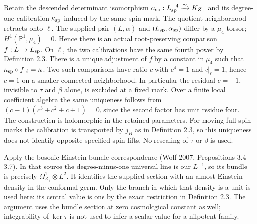 \documentclass[
  english,
  11pt,
  reqno]{amsart}
\begin{document}
Retain the descended determinant isomorphism
\(\alpha_{\rm sp}:L_{\rm sp}^{-4}\xrightarrow{\sim}K_{Z_+}\) and its
degree-one calibration \(\kappa_{\rm sp}\) induced by the same spin
mark. The quotient neighborhood retracts onto \(\ell\). The supplied
pair \((L,\alpha)\) and \((L_{\rm sp},\alpha_{\rm sp})\) differ by a
\(\mu_4\) torsor; \(H^1(\mathbb P^1,\mu_4)=0\). Hence there is an actual
root-preserving comparison \(f:L\to L_{\rm sp}\). On \(\ell\), the two
calibrations have the same fourth power by Definition 2.3. There is a
unique adjustment of \(f\) by a constant in \(\mu_4\) such that
\(\kappa_{\rm sp}\circ f|_\ell=\kappa\). Two such comparisons have ratio
\(c\) with \(c^4=1\) and \(c|_\ell=1\), hence \(c=1\) on a smaller
connected neighborhood. In particular the residual \(c=-1\), invisible
to \(\tau\) and \(\beta\) alone, is excluded at a fixed mark. Over a
finite local coefficient algebra the same uniqueness follows from
\((c-1)(c^3+c^2+c+1)=0\), since the second factor has unit residue four.
The construction is holomorphic in the retained parameters. For moving
full-spin marks the calibration is transported by \(j_B\) as in
Definition 2.3, so this uniqueness does not identify opposite specified
spin lifts. No rescaling of \(\tau\) or \(\beta\) is used.

Apply the bosonic Einstein-bundle correspondence (Wolf 2007,
Propositions 3.4--3.7). In that source the degree-minus-one universal
line is our \(L^{-1}\), so its bundle is precisely
\(\Omega^1_{Z_+}\otimes L^2\). It identifies the supplied section with
an almost-Einstein density in the conformal germ. Only the branch in
which that density is a unit is used here: its central value is one by
the exact restriction in Definition 2.3. The argument uses the bundle
section at zero cosmological constant as well; integrability of
\(\ker\tau\) is not used to infer a scalar value for a nilpotent family.
\end{document}

